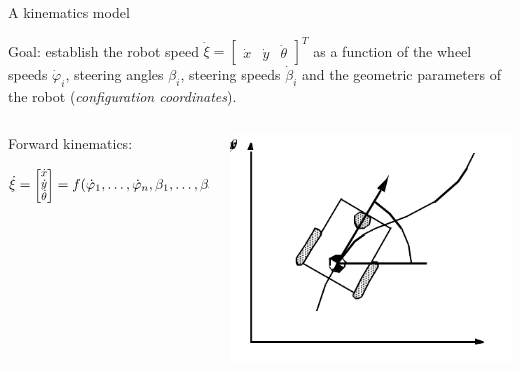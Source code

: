 \documentclass[compress]{beamer}
\newcommand{\colvec}[2][.8]{%
  \scalebox{#1}{%
    \renewcommand{\arraystretch}{.8}%
    $\begin{bmatrix}#2\end{bmatrix}$%
  }
}
\begin{document}
\begin{frame}{A kinematics model}

    Goal: establish the robot speed $\dot\xi = \begin{bmatrix} \dot{x} & \dot{y}
    & \dot{\theta}\end{bmatrix}^T$  as a function of the wheel speeds
        $\dot\varphi_i$, steering
    angles $\beta_i$, steering speeds $\dot\beta_i$ and the geometric parameters of the robot
    (\emph{configuration coordinates}).

        \begin{columns}
            \begin{column}{0.7\linewidth}
                Forward kinematics:

                \[
                    \dot\xi = \colvec{\dot{x} \\ \dot{y} \\ \dot{\theta} } = f(\dot\varphi_1,\ldots,\dot\varphi_n,\beta_1,\ldots,\beta_m,\dot\beta_1,\ldots,\dot\beta_m)
                \]

            \end{column}
            \begin{column}{0.3\linewidth}
                \begin{center}
                    \includegraphics[width=\linewidth]{kinematic_model}
                \end{center}

            \end{column}
        \end{columns}



\end{frame}
\end{document}
